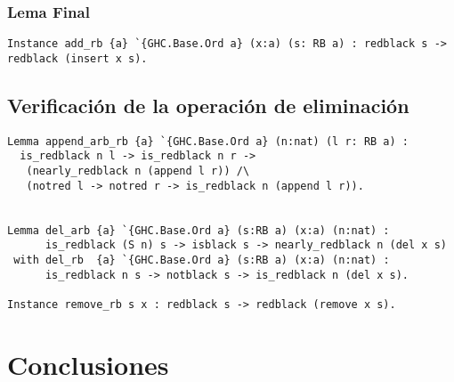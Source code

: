 \documentclass[letterpaper,12pt,oneside]{book}
\begin{document}
\subsection{Lema Final}
\begin{verbatim}
Instance add_rb {a} `{GHC.Base.Ord a} (x:a) (s: RB a) : redblack s -> redblack (insert x s).
\end{verbatim}
\section{Verificación de la operación de eliminación}
\begin{verbatim}
Lemma append_arb_rb {a} `{GHC.Base.Ord a} (n:nat) (l r: RB a) : 
  is_redblack n l -> is_redblack n r ->
   (nearly_redblack n (append l r)) /\
   (notred l -> notred r -> is_redblack n (append l r)).


Lemma del_arb {a} `{GHC.Base.Ord a} (s:RB a) (x:a) (n:nat) :
      is_redblack (S n) s -> isblack s -> nearly_redblack n (del x s)
 with del_rb  {a} `{GHC.Base.Ord a} (s:RB a) (x:a) (n:nat) :
      is_redblack n s -> notblack s -> is_redblack n (del x s).

Instance remove_rb s x : redblack s -> redblack (remove x s).
\end{verbatim}
\chapter{Conclusiones}  

%
%

\backmatter%
\end{document}
